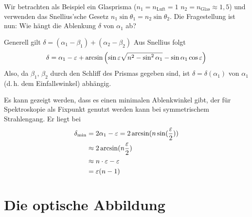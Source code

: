
Wir betrachten als Beispiel ein Glasprisma ($n_1=n_\text{Luft}=1$
$n_2=n_\text{Glas}\approx 1,5$) und verwenden das Snellius'sche Gesetz
$n_1\sin\theta_1 = n_2\sin\theta_2$.
Die Fragestellung ist nun: Wie hängt die Ablenkung $\delta$ von
$\alpha_1$ ab?

Generell gilt $\delta = (\alpha_1-\beta_1)+(\alpha_2-\beta_2)$
Aus Snellius folgt
\begin{gather*}
  \delta = \alpha_1 - \varepsilon
  + \arcsin\left(
    \sin\varepsilon\sqrt{n^2-\sin^2\alpha_1}-\sin\alpha_1\cos\varepsilon
    \right)
\end{gather*}
Also, da $\beta_1$, $\beta_2$ durch den Schliff des Prismas gegeben
sind, ist $\delta=\delta(\alpha_1)$ von $\alpha_1$ (d.\,h. dem
Einfallswinkel) abhängig.

Es kann gezeigt werden, dass es einen minimalen Ablenkwinkel gibt, der
für Spektroskopie als Fixpunkt genutzt werden kann bei symmetrischem
Strahlengang. Er liegt bei
\begin{align*}
  \delta_\text{min} 
  &= 2\alpha_1-\varepsilon = 2\arcsin(n\sin(\frac{\varepsilon}{2}))\\
  &\approx 2\arcsin(n\frac{\varepsilon}{2})\\
  &\approx n\cdot\varepsilon - \varepsilon \\
  &= \varepsilon(n-1)
\end{align*}



\section{Die optische Abbildung}
